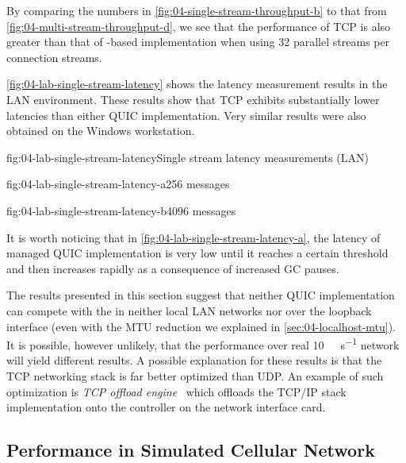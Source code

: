 By comparing the numbers in \autoref{fig:04-single-stream-throughput-b} to that from
\autoref{fig:04-multi-stream-throughput-d}, we see that the performance of TCP is also greater than
that of \libmsquic{}-based implementation when using 32 parallel streams per connection streams.

\autoref{fig:04-lab-single-stream-latency} shows the latency measurement results in the LAN
environment. These results show that TCP exhibits substantially lower latencies than either QUIC
implementation. Very similar results were also obtained on the Windows workstation.

\begin{myFigure}{fig:04-lab-single-stream-latency}{Single stream latency measurements (LAN)}
\begin{mySubfigure}{0.49\linewidth}{fig:04-lab-single-stream-latency-a}{\SI{256}{\byte} messages}
\footnotesize

\end{mySubfigure}
\begin{mySubfigure}{0.49\linewidth}{fig:04-lab-single-stream-latency-b}{\SI{4096}{\byte} messages}
\footnotesize

\end{mySubfigure}
\end{myFigure}

It is worth noticing that in \autoref{fig:04-lab-single-stream-latency-a}, the latency of managed
QUIC implementation is very low until it reaches a certain threshold and then increases rapidly as a
consequence of increased GC pauses.

The results presented in this section suggest that neither QUIC implementation can compete with the
\SslStream{} in neither local LAN networks nor over the loopback interface (even with the MTU
reduction we explained in \autoref{sec:04-localhost-mtu}). It is possible, however unlikely, that
the performance over real \SI[per-mode=symbol]{10}{\giga\bit\per\second} network will yield
different results. A possible explanation for these results is that the TCP networking stack is far
better optimized than UDP\@. An example of such optimization is \textit{TCP offload
engine}~\cite{wiki:tcp-offload-engine} which offloads the TCP/IP stack implementation onto the
controller on the network interface card.

\subsection{Performance in Simulated Cellular Network}

